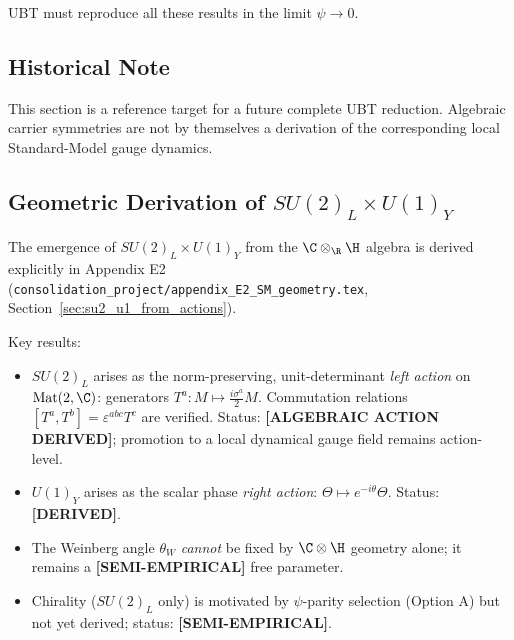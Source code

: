 UBT must reproduce all these results in the limit $\psi \to 0$.

\subsection{Historical Note}

This section is a reference target for a future complete UBT reduction.  Algebraic carrier symmetries are not by themselves a derivation of the corresponding local Standard-Model gauge dynamics.

\subsection{Geometric Derivation of $SU(2)_L \times U(1)_Y$}

The emergence of $SU(2)_L \times U(1)_Y$ from the $\C\otimes_\R\H$ algebra is derived
explicitly in Appendix E2 (\texttt{consolidation\_project/appendix\_E2\_SM\_geometry.tex},
Section~\ref{sec:su2_u1_from_actions}).

Key results:
\begin{itemize}
  \item $SU(2)_L$ arises as the norm-preserving, unit-determinant \emph{left action}
    on $\mathrm{Mat}(2,\C)$: generators $T^a : M \mapsto \frac{i\sigma^a}{2} M$.
    Commutation relations $[T^a, T^b] = \varepsilon^{abc}T^c$ are verified.
    Status: \textbf{[ALGEBRAIC ACTION DERIVED]}; promotion to a local dynamical gauge field remains action-level.
  \item $U(1)_Y$ arises as the scalar phase \emph{right action}: $\Theta \mapsto e^{-i\theta}\Theta$.
    Status: \textbf{[DERIVED]}.
  \item The Weinberg angle $\theta_W$ \emph{cannot} be fixed by $\C\otimes\H$ geometry alone;
    it remains a \textbf{[SEMI-EMPIRICAL]} free parameter.
  \item Chirality ($SU(2)_L$ only) is motivated by $\psi$-parity selection (Option A)
    but not yet derived; status: \textbf{[SEMI-EMPIRICAL]}.
\end{itemize}



\providecommand{\Lone}{\textbf{[L1]}}

